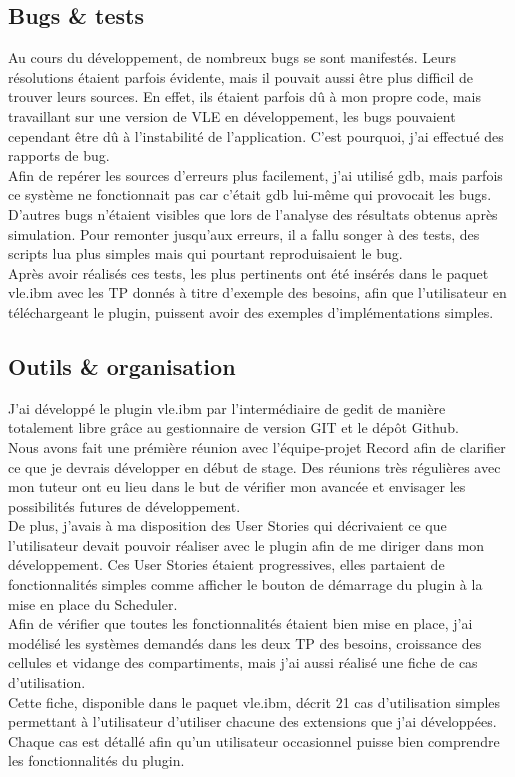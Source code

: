 \subsection{Bugs \& tests}
Au cours du développement, de nombreux bugs se sont manifestés. Leurs résolutions étaient parfois évidente, mais il pouvait aussi être plus difficil de trouver leurs sources. En effet, ils étaient parfois dû à mon propre code, mais travaillant sur une version de VLE en développement, les bugs pouvaient cependant être dû à l'instabilité de l'application. C'est pourquoi, j'ai effectué des rapports de bug.\\

Afin de repérer les sources d'erreurs plus facilement, j'ai utilisé gdb, mais parfois ce système ne fonctionnait pas car c'était gdb lui-même qui provocait les bugs.\\
D'autres bugs n'étaient visibles que lors de l'analyse des résultats obtenus après simulation. Pour remonter jusqu'aux erreurs, il a fallu songer à des tests, des scripts lua plus simples mais qui pourtant reproduisaient le bug.\\
Après avoir réalisés ces tests, les plus pertinents ont été insérés dans le paquet vle.ibm avec les TP donnés à titre d'exemple des besoins, afin que l'utilisateur en téléchargeant le plugin, puissent avoir des exemples d'implémentations simples.

\subsection{Outils \& organisation}
J'ai développé le plugin vle.ibm par l'intermédiaire de gedit de manière totalement libre grâce au gestionnaire de version GIT et le dépôt Github.\\
Nous avons fait une prémière réunion avec l'équipe-projet Record afin de clarifier ce que je devrais développer en début de stage. Des réunions très régulières avec mon tuteur ont eu lieu dans le but de vérifier mon avancée et envisager les possibilités futures de développement.\\
De plus, j'avais à ma disposition des User Stories qui décrivaient ce que l'utilisateur devait pouvoir réaliser avec le plugin afin de me diriger dans mon développement. Ces User Stories étaient progressives, elles partaient de fonctionnalités simples comme afficher le bouton de démarrage du plugin à la mise en place du Scheduler.\\
Afin de vérifier que toutes les fonctionnalités étaient bien mise en place, j'ai modélisé les systèmes demandés dans les deux TP des besoins, croissance des cellules et vidange des compartiments, mais j'ai aussi réalisé une fiche de cas d'utilisation.\\
Cette fiche, disponible dans le paquet vle.ibm, décrit 21 cas d'utilisation simples permettant à l'utilisateur d'utiliser chacune des extensions que j'ai développées. Chaque cas est détallé afin qu'un utilisateur occasionnel puisse bien comprendre les fonctionnalités du plugin.

